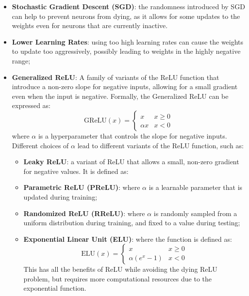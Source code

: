 \begin{itemize}
    \item \textbf{Stochastic Gradient Descent (SGD)}: the randomness introduced by SGD can help to prevent neurons from dying, as it allows for some updates to the weights even for neurons that are currently inactive.
    \item \textbf{Lower Learning Rates}: using too high learning rates can cause the weights to update too aggressively, possibly leading to weights in the highly negative range;
    \item \textbf{Generalized ReLU}: A family of variants of the ReLU function that introduce a non-zero slope for negative inputs, allowing for a small gradient even when the input is negative.
    Formally, the Generalized ReLU can be expressed as:
    \begin{equation*}
    \text{GReLU}(x) = \begin{cases} x & x \geq 0 \\ \alpha x & x < 0 \end{cases}
    \end{equation*}
    where $\alpha$ is a hyperparameter that controls the slope for negative inputs. Different choices of $\alpha$ lead to different variants of the ReLU function, such as:
    \begin{itemize}
        \item \textbf{Leaky ReLU}: a variant of ReLU that allows a small, non-zero gradient for negative values. It is defined as:
        \begin{figure}[H]
            \centering
            
        \end{figure}
        \item \textbf{Parametric ReLU (PReLU)}: where $\alpha$ is a learnable parameter that is updated during training;
        \item \textbf{Randomized ReLU (RReLU)}: where $\alpha$ is randomly sampled from a uniform distribution during training, and fixed to a value during testing;
        \item \textbf{Exponential Linear Unit (ELU)}: where the function is defined as:
        \begin{equation*}
            \text{ELU}(x) = \begin{cases} x & x \geq 0 \\ \alpha (e^x - 1) & x < 0 \end{cases}
        \end{equation*}
        This has all the benefits of ReLU while avoiding the dying ReLU problem, but requires more computational resources due to the exponential function.
    \end{itemize}
\end{itemize}
